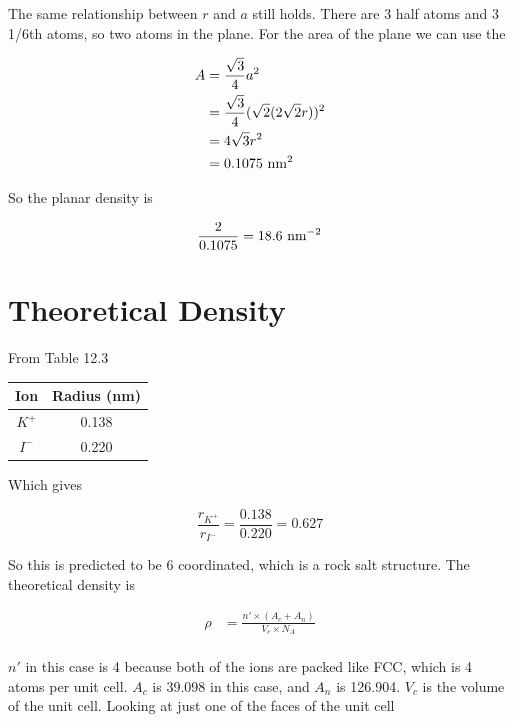 \documentclass{article}
\begin{document}
The same relationship between $r$ and $a$ still holds. There are 3 half atoms and 3 1/6th atoms, so two atoms in the plane. For the area of the plane we can use the 

\begin{align*}
    A &= \frac{\sqrt{3}}{4} a^2 \\
    &= \frac{\sqrt{3}}{4} (\sqrt{2}(2\sqrt{2} r))^2 \\
    &= 4 \sqrt{3} r^2 \\
    &= 0.1075 \ \textnormal{nm}^2
\end{align*}

So the planar density is

\[
    \frac{2}{0.1075} = 18.6 \ \textnormal{nm}^{-2}
\]

\section{Theoretical Density}

From Table 12.3

\begin{table}[H]
    \centering
    \begin{tabular}{ c c }
        \hline
        Ion & Radius (nm) \\
        \hline
        $K^+$ & 0.138 \\
        $I^-$ & 0.220 \\
        \hline
    \end{tabular}
\end{table}

Which gives 

\[
    \frac{r_{K^+}}{r_{I^-}} = \frac{0.138}{0.220} = 0.627
\]

So this is predicted to be 6 coordinated, which is a rock salt structure. The theoretical density is

\begin{align*}
    \rho &= \frac{n' \times \left( A_c + A_n \right)}{V_c \times N_A} \\
    \tag*{(eqn 12.1 in the book)}
\end{align*}

$n'$ in this case is 4 because both of the ions are packed like FCC, which is 4 atoms per unit cell. $A_c$ is 39.098 in this case, and $A_n$ is 126.904. $V_c$ is the volume of the unit cell. Looking at just one of the faces of the unit cell
\end{document}
